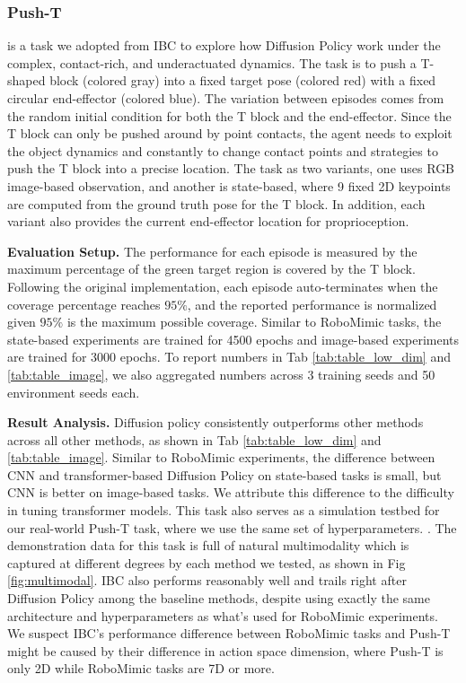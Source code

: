 \subsubsection{\textbf{Push-T}} 
\label{sec:eval_sim_pusht}
is a task we adopted from IBC \cite{ibc} to explore how Diffusion Policy work under the complex, contact-rich, and underactuated dynamics. The task is to push a T-shaped block (colored gray) into a fixed target pose (colored red) with a fixed circular end-effector (colored blue). The variation between episodes comes from the random initial condition for both the T block and the end-effector. Since the T block can only be pushed around by point contacts, the agent needs to exploit the object dynamics and constantly to change contact points and strategies to push the T block into a precise location. The task as two variants, one uses RGB image-based observation, and another is state-based, where 9 fixed 2D keypoints are computed from the ground truth pose for the T block. In addition, each variant also provides the current end-effector location for proprioception.

 \textbf{Evaluation Setup.}  The performance for each episode is measured by the maximum percentage of the green target region is covered by the T block. Following the original implementation, each episode auto-terminates when the coverage percentage reaches $95\% $, and the reported performance is normalized given $95 \%$ is the maximum possible coverage. Similar to RoboMimic tasks, the state-based experiments are trained for 4500 epochs and image-based experiments are trained for 3000 epochs. To report numbers in Tab \ref{tab:table_low_dim} and \ref{tab:table_image}, we also aggregated numbers across 3 training seeds and 50 environment seeds each.

\textbf{Result Analysis.} Diffusion policy  consistently outperforms other methods across all other methods, as shown in Tab \ref{tab:table_low_dim} and \ref{tab:table_image}. Similar to RoboMimic experiments, the difference between CNN and transformer-based Diffusion Policy on state-based tasks is small, but CNN is better on image-based tasks. We attribute this difference to the difficulty in tuning transformer models. This task also serves as a simulation testbed for our real-world Push-T task, where we use the same set of hyperparameters. . The demonstration data for this task is full of natural multimodality which is captured at different degrees by each method we tested, as shown in Fig \ref{fig:multimodal}. IBC \cite{ibc} also performs reasonably well and trails right after Diffusion Policy among the baseline methods, despite using exactly the same architecture and hyperparameters as what's used for RoboMimic experiments. We suspect IBC's performance difference between RoboMimic tasks and Push-T might be caused by their difference in action space dimension, where Push-T is only 2D while RoboMimic tasks are 7D or more.

